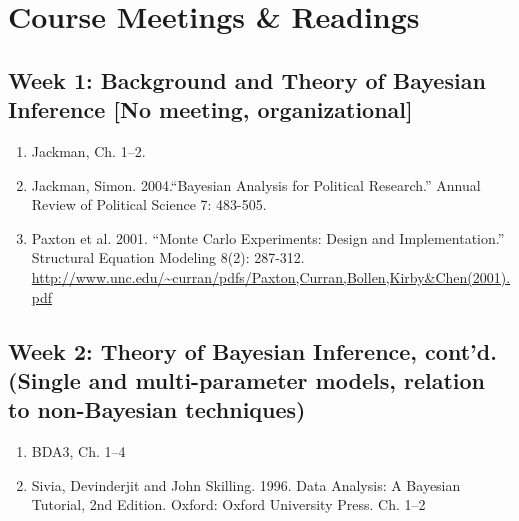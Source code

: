 \documentclass[11pt, leqno, fleqn]{article}
\begin{document}
\section*{Course Meetings \& Readings}
\subsection*{Week 1: Background and Theory of Bayesian Inference [No meeting, organizational]}
	\begin{enumerate}
	\item[] Jackman, Ch. 1--2.
	\item[] Jackman, Simon. 2004.``Bayesian Analysis for Political
Research.'' Annual Review of Political Science 7: 483-505.
	\item[] Paxton et al. 2001. ``Monte Carlo Experiments: Design and Implementation.'' Structural Equation Modeling 8(2): 287-312. \url{http://www.unc.edu/~curran/pdfs/Paxton,Curran,Bollen,Kirby&Chen(2001).pdf}
	\end{enumerate}
\subsection*{Week 2: Theory of Bayesian Inference, cont'd. (Single and multi-parameter models, relation to non-Bayesian techniques)}
	\begin{enumerate}
	\item[] BDA3, Ch. 1--4
	\item[] Sivia, Devinderjit and John Skilling. 1996. Data Analysis: A Bayesian Tutorial, 2nd Edition. Oxford: Oxford University Press. Ch. 1--2
	\end{enumerate}
\end{document}
